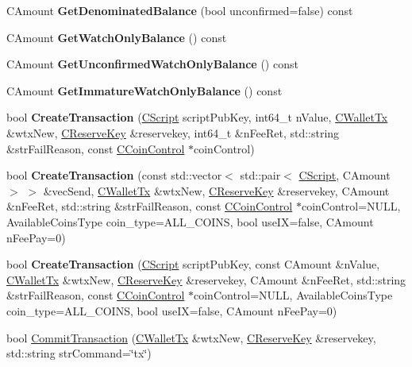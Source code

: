 \begin{DoxyCompactItemize}
C\+Amount {\bfseries Get\+Denominated\+Balance} (bool unconfirmed=false) const
\item 
C\+Amount {\bfseries Get\+Watch\+Only\+Balance} () const
\item 
C\+Amount {\bfseries Get\+Unconfirmed\+Watch\+Only\+Balance} () const
\item 
C\+Amount {\bfseries Get\+Immature\+Watch\+Only\+Balance} () const
\item 
\mbox{\label{class_c_wallet_a99c4e7f5a9812fdcc9fe21578db644c8}} 
bool {\bfseries Create\+Transaction} (\mbox{\hyperlink{class_c_script}{C\+Script}} script\+Pub\+Key, int64\+\_\+t n\+Value, \mbox{\hyperlink{class_c_wallet_tx}{C\+Wallet\+Tx}} \&wtx\+New, \mbox{\hyperlink{class_c_reserve_key}{C\+Reserve\+Key}} \&reservekey, int64\+\_\+t \&n\+Fee\+Ret, std\+::string \&str\+Fail\+Reason, const \mbox{\hyperlink{class_c_coin_control}{C\+Coin\+Control}} $\ast$coin\+Control)
\item 
\mbox{\label{class_c_wallet_aebe41d3dc9b127af132020594b4981d2}} 
bool {\bfseries Create\+Transaction} (const std\+::vector$<$ std\+::pair$<$ \mbox{\hyperlink{class_c_script}{C\+Script}}, C\+Amount $>$ $>$ \&vec\+Send, \mbox{\hyperlink{class_c_wallet_tx}{C\+Wallet\+Tx}} \&wtx\+New, \mbox{\hyperlink{class_c_reserve_key}{C\+Reserve\+Key}} \&reservekey, C\+Amount \&n\+Fee\+Ret, std\+::string \&str\+Fail\+Reason, const \mbox{\hyperlink{class_c_coin_control}{C\+Coin\+Control}} $\ast$coin\+Control=N\+U\+LL, Available\+Coins\+Type coin\+\_\+type=A\+L\+L\+\_\+\+C\+O\+I\+NS, bool use\+IX=false, C\+Amount n\+Fee\+Pay=0)
\item 
bool {\bfseries Create\+Transaction} (\mbox{\hyperlink{class_c_script}{C\+Script}} script\+Pub\+Key, const C\+Amount \&n\+Value, \mbox{\hyperlink{class_c_wallet_tx}{C\+Wallet\+Tx}} \&wtx\+New, \mbox{\hyperlink{class_c_reserve_key}{C\+Reserve\+Key}} \&reservekey, C\+Amount \&n\+Fee\+Ret, std\+::string \&str\+Fail\+Reason, const \mbox{\hyperlink{class_c_coin_control}{C\+Coin\+Control}} $\ast$coin\+Control=N\+U\+LL, Available\+Coins\+Type coin\+\_\+type=A\+L\+L\+\_\+\+C\+O\+I\+NS, bool use\+IX=false, C\+Amount n\+Fee\+Pay=0)
\item 
bool \mbox{\hyperlink{group___actions_gaa13fbeaebd271f910a54cc5b82d73fde}{Commit\+Transaction}} (\mbox{\hyperlink{class_c_wallet_tx}{C\+Wallet\+Tx}} \&wtx\+New, \mbox{\hyperlink{class_c_reserve_key}{C\+Reserve\+Key}} \&reservekey, std\+::string str\+Command=\char`\"{}tx\char`\"{})

\end{DoxyCompactItemize}
